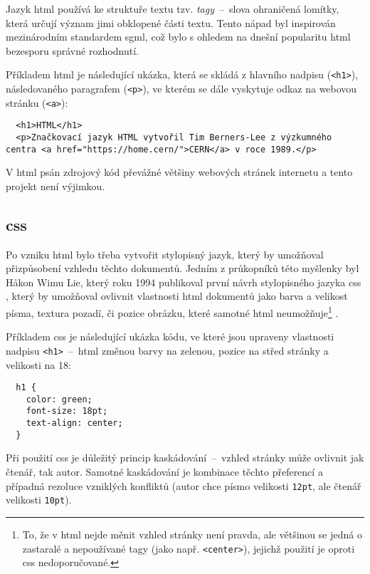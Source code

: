 \documentclass[a4paper, 12pt]{article}
\begin{document}
  Jazyk \gls{html} používá ke struktuře textu tzv. \emph{tagy}~--~slova ohraničená lomítky, která určují význam jimi obklopené části textu. Tento nápad byl inspirován mezinárodním standardem \gls{sgml}, což bylo s ohledem na dnešní popularitu \gls{html} bezesporu správné rozhodnutí.

  Příkladem \gls{html} je následující ukázka, která se skládá z hlavního nadpisu (\texttt{<h1>}), následovaného paragrafem (\texttt{<p>}), ve kterém se dále vyskytuje odkaz na webovou stránku (\texttt{<a>}):

  \begin{verbatim}
  <h1>HTML</h1>
  <p>Značkovací jazyk HTML vytvořil Tim Berners-Lee z výzkumného centra <a href="https://home.cern/">CERN</a> v roce 1989.</p>
  \end{verbatim}

  V \gls{html} psán zdrojový kód převážné většiny webových stránek internetu a tento projekt není výjimkou.


  \subsection{\acrshort{css}} \label{sec:CSS}
  Po vzniku \gls{html} bylo třeba vytvořit stylopisný jazyk, který by umožňoval přizpůsobení vzhledu těchto dokumentů. Jedním z průkopníků této myšlenky byl Håkon Wimu Lie, který roku 1994 publikoval první návrh stylopisného jazyka \gls{css} \cite{css-proposal}, který by umožňoval ovlivnit vlastnosti \gls{html} dokumentů jako barva a velikost písma, textura pozadí, či pozice obrázku, které samotné \gls{html} neumožňuje\footnote{To, že v \gls{html} nejde měnit vzhled stránky není pravda, ale většinou se jedná o zastaralé a nepoužívané tagy (jako např. \texttt{<center>}), jejichž použití je oproti \gls{css} nedoporučované.} \cite{css-saga}.

  Příkladem \gls{css} je následující ukázka kódu, ve které jsou upraveny vlastnosti nadpisu \texttt{<h1>}~--~\gls{html} změnou barvy na zelenou, pozice na střed stránky a velikosti na 18:

  \begin{verbatim}
  h1 {
    color: green;
    font-size: 18pt;
    text-align: center;
  }
  \end{verbatim}

  Při použití \gls{css} je důležitý princip kaskádování~--~vzhled stránky může ovlivnit jak čtenář, tak autor. Samotné kaskádování je kombinace těchto přeferencí a případná rezoluce vzniklých konfliktů (autor chce písmo velikosti \texttt{12pt}, ale čtenář velikosti \texttt{10pt}).
\end{document}

